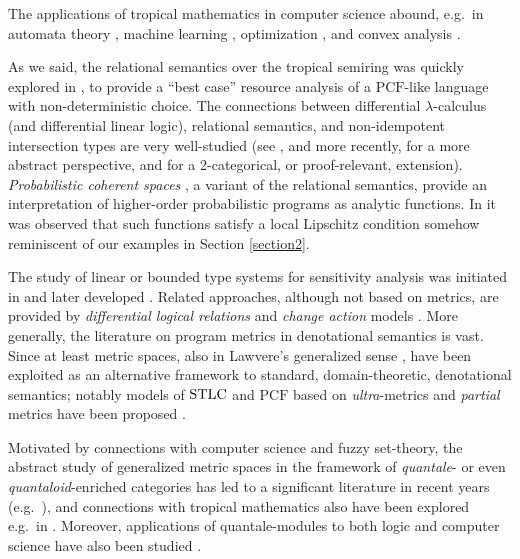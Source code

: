 

The applications of tropical mathematics in computer science abound, e.g.~in automata theory \cite{Chua1992, Simon}, machine learning \cite{Maragos2021, Pachter2004, Zhang2018}, optimization \cite{Akian2011, Akian2012}, and convex analysis \cite{Lucet2009}. 

As we said, the relational semantics over the tropical semiring was quickly explored in \cite{Manzo2013}, to provide a ``best case'' resource analysis of a $\mathrm{PCF}$-like language with non-deterministic choice. 
The connections between differential $\lambda$-calculus (and differential linear logic), relational semantics, and non-idempotent intersection types are very well-studied (see \cite{decarvalho2018}, and more recently, \cite{Mazza2016} for a more abstract perspective, and \cite{Olimpieri2021, Galal2021} for a 2-categorical, or proof-relevant, extension).
\emph{Probabilistic coherent spaces} \cite{Ehrhard2011}, a variant of  the relational semantics, provide an interpretation of higher-order probabilistic programs
as analytic functions. In \cite{Ehrhard2022} it was observed that such functions satisfy a local Lipschitz condition somehow reminiscent of our examples in Section \ref{section2}.


The study of linear or bounded type systems for sensitivity analysis was initiated in \cite{Girard92tcs} and later developed \cite{Schopp, SchoppDalLago, Reed2010}.
Related approaches, although not based on metrics, are provided by \emph{differential logical relations} \cite{dallago} and \emph{change action} models \cite{Picallo2019}.
More generally, the literature on program metrics in denotational semantics is vast. Since at least \cite{VANBREUGEL20011} metric spaces, also in Lawvere's generalized sense \cite{Lawvere1973}, have been exploited as an alternative framework to standard, domain-theoretic, denotational semantics; notably models of $\mathrm{STLC}$ and $\mathrm{PCF}$ based on 
\emph{ultra}-metrics and \emph{partial} metrics have been proposed  \cite{Escardo1999,PistoneLICS, PistoneFSCD2022}.



Motivated by connections with computer science and fuzzy set-theory, 
the abstract study of generalized metric spaces in the framework of \emph{quantale}- or even \emph{quantaloid}-enriched categories has led to a significant literature in recent years (e.g.~\cite{Hofmann2014, Stubbe2014}), 
and connections with tropical mathematics also have been explored e.g.~in \cite{Fuji, Willerton2013}. Moreover, applications of quantale-modules to both logic and computer science have also been studied \cite{Abramsky1993b, Russo2007}.


